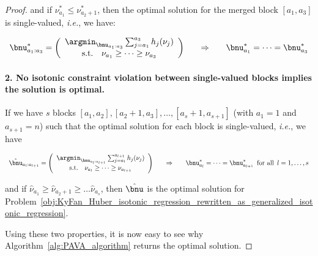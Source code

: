 \begin{proof}
    and if $\nu_{a_1}^* \leq \nu_{a_2+1}^*$, then the optimal solution for the merged block $[a_1, a_3]$ is single-valued, \textit{i.e.}, we have:
    
    \begin{equation}
    \begin{array}{c@{\hspace{2em}}c@{\hspace{2em}}c}
    \bnu_{a_1:a_3}^* =  
    \left(\begin{array}{c}
    \argmin_{\bnu_{a_1:a_3}} \sum_{j=a_1}^{a_3} h_j(\nu_j) \\
    \text{s.t.} \quad \nu_{a_1} \geq \cdots \geq \nu_{a_3}
    \end{array}\right) & 
    \Rightarrow & \bnu_{a_1}^* = \cdots = \bnu_{a_3}^*
    \end{array}
    \end{equation}
    
    \paragraph{2. No isotonic constraint violation between single-valued blocks implies the solution is optimal.}
    If we have $s$ blocks $[a_1, a_2], [a_2+1, a_3], \ldots, [a_{s}+1, a_{s+1}]$ (with $a_1=1$ and $a_{s+1}=n$) such that the optimal solution for each block is single-valued, \textit{i.e.}, we have
    
    \begin{equation}
    \begin{array}{c@{\hspace{2em}}c@{\hspace{2em}}c}
    \hat{\bnu}_{a_l:a_{l+1}} =
    \left(\begin{array}{c}
    \argmin_{\bnu_{a_l:a_{l+1}}} \sum_{j=a_l}^{a_{l+1}} h_j(\nu_j) \\
    \text{s.t.} \quad \nu_{a_l} \geq \cdots \geq \nu_{a_{l+1}}
    \end{array}\right) &
    \Rightarrow & \bnu_{a_l}^* = \cdots = \bnu_{a_{l+1}}^* \, \text{ for all } \, l=1, \ldots, s
    \end{array}
    \end{equation}
    
    and if $\hat{\nu}_{a_1} \geq \hat{\nu}_{a_2+1} \geq \ldots \hat{\nu}_{a_{s}}$, then $\hat{\bnu}$ is the optimal solution for Problem~\eqref{obj:KyFan_Huber_isotonic_regression_rewritten_as_generalized_isotonic_regression}.
    
    Using these two properties, it is now easy to see why Algorithm~\ref{alg:PAVA_algorithm} returns the optimal solution.
    

\end{proof}
